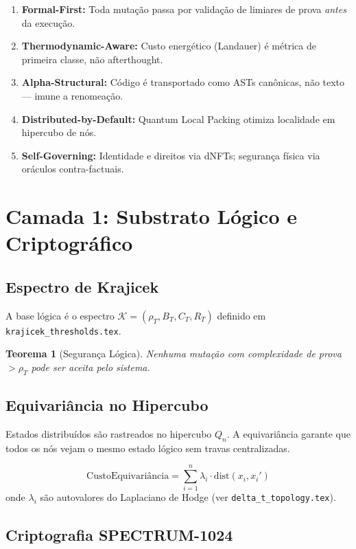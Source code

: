\documentclass[11pt,a4paper]{article}
\newtheorem{theorem}{Teorema}[section]
\newcommand{\rhoT}{\rho_T}
\newcommand{\BT}{B_T}
\newcommand{\CT}{C_T}
\newcommand{\RT}{R_T}
\begin{document}
\begin{enumerate}
    \item \textbf{Formal-First:} Toda mutação passa por validação de limiares de prova \textit{antes} da execução.
    \item \textbf{Thermodynamic-Aware:} Custo energético (Landauer) é métrica de primeira classe, não afterthought.
    \item \textbf{Alpha-Structural:} Código é transportado como ASTs canônicas, não texto — imune a renomeação.
    \item \textbf{Distributed-by-Default:} Quantum Local Packing otimiza localidade em hipercubo de nós.
    \item \textbf{Self-Governing:} Identidade e direitos via dNFTs; segurança física via oráculos contra-factuais.
\end{enumerate}

\section{Camada 1: Substrato Lógico e Criptográfico}

\subsection{Espectro de Krajicek}

A base lógica é o espectro $\mathcal{K} = (\rhoT, \BT, \CT, \RT)$ definido em \texttt{krajicek\_thresholds.tex}. 

\begin{theorem}[Segurança Lógica]
Nenhuma mutação com complexidade de prova $> \rhoT$ pode ser aceita pelo sistema.
\end{theorem}

\subsection{Equivariância no Hipercubo}

Estados distribuídos são rastreados no hipercubo $Q_n$. A equivariância garante que todos os nós vejam o mesmo estado lógico sem travas centralizadas.

\begin{equation}
    \text{CustoEquivariância} = \sum_{i=1}^n \lambda_i \cdot \text{dist}(x_i, x_i')
\end{equation}
onde $\lambda_i$ são autovalores do Laplaciano de Hodge (ver \texttt{delta\_t\_topology.tex}).

\subsection{Criptografia SPECTRUM-1024}
\end{document}
